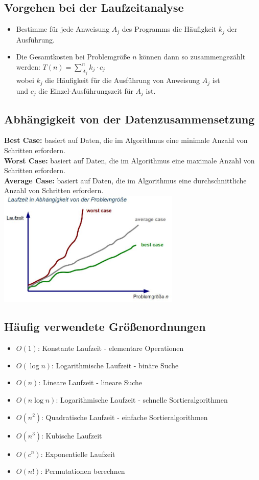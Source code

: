 \documentclass{scrreprt}
\begin{document}
\subsection{Vorgehen bei der Laufzeitanalyse}
\begin{itemize}
  \item Bestimme für jede Anweisung $A_j$ des Programms die Häufigkeit $k_j$ der Ausführung.
  \item Die Gesamtkosten bei Problemgröße $n$ können dann so zusammengezählt werden:
  $T(n) = \sum_{A_j}^n k_j \cdot c_j$
  \\wobei $k_j$ die Häufigkeit für die Ausführung von Anweisung $A_j$ ist
  \\und $c_j$ die Einzel-Ausführungszeit für $A_j$ ist.
\end{itemize}
\subsection{Abhängigkeit von der Datenzusammensetzung}
\textbf{Best Case:} basiert auf Daten, die im Algorithmus eine minimale Anzahl von Schritten erfordern.
\\\textbf{Worst Case:} basiert auf Daten, die im Algorithmus eine maximale Anzahl von Schritten erfordern.
\\\textbf{Average Case:} basiert auf Daten, die im Algorithmus eine durchschnittliche Anzahl von Schritten erfordern.
\\\includegraphics[width=0.65\textwidth]{graphics/Laufzeit}
\subsection{Häufig verwendete Größenordnungen}
\begin{itemize}
  \item $O (1)$: Konstante Laufzeit - elementare Operationen
  \item $O (\log n)$: Logarithmische Laufzeit - binäre Suche
  \item $O (n)$: Lineare Laufzeit - lineare Suche
  \item $O (n \log n)$: Logarithmische Laufzeit - schnelle Sortieralgorithmen
  \item $O (n^2)$: Quadratische Laufzeit - einfache Sortieralgorithmen
  \item $O (n^3)$: Kubische Laufzeit
  \item $O (c^n)$: Exponentielle Laufzeit
  \item $O (n!)$: Permutationen berechnen
\end{itemize}
\end{document}
